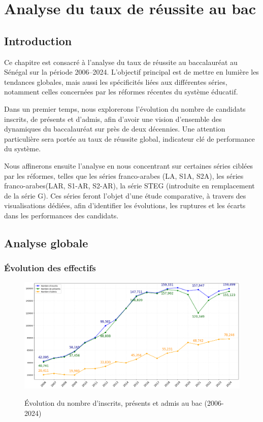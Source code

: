 \chapter{Analyse du taux de réussite au bac}

\section{Introduction}

Ce chapitre est consacré à l’analyse du taux de réussite au baccalauréat au Sénégal sur la période 2006–2024. 
L’objectif principal est de mettre en lumière les tendances globales, mais aussi les spécificités liées aux différentes séries, notamment celles concernées par les réformes récentes du système éducatif.

Dans un premier temps, nous explorerons l’évolution du nombre de candidats inscrits, de présents et d’admis, afin d’avoir une vision d’ensemble des dynamiques du baccalauréat sur près de deux décennies. 
Une attention particulière sera portée au taux de réussite global, indicateur clé de performance du système.

Nous affinerons ensuite l’analyse en nous concentrant sur certaines séries ciblées par les réformes, telles que les séries franco-arabes (LA, S1A, S2A), les séries franco-arabes(LAR, S1-AR, S2-AR), la série STEG (introduite en remplacement de la série G). 
Ces séries feront l’objet d’une étude comparative, à travers des visualisations dédiées, afin d’identifier les évolutions, les ruptures et les écarts dans les performances des candidats.

\section{Analyse globale}

\newpage
\subsection{Évolution des effectifs}

\begin{figure}[ht]
\centering
\caption{Évolution du nombre d'inscrits, présents et admis au bac (2006-2024)}
\includegraphics[width=1\textwidth]{figure/Inscrits_bac.png}
\label{fig:inscrits_admis}
\end{figure}

